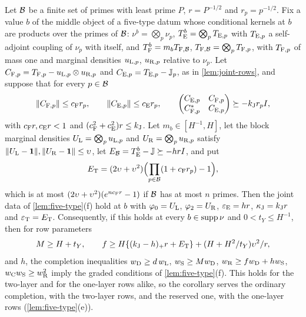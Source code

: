 \begin{corollary}\label{cor:joint-completion-blocks}
Let $\Blk$ be a finite set of primes with least prime $P$, $r=P^{-1/2}$ and
$r_p=p^{-1/2}$. Fix a value $b$ of the middle object of a five-type datum whose
conditional kernels at $b$ are products over the primes of $\Blk$:
$\nu^b=\bigotimes_p\nu_p$, $T^b_{\rm E}=\bigotimes_pT_{{\rm E},p}$ with
$T_{{\rm E},p}$ a self-adjoint coupling of $\nu_p$ with itself, and
$T^b_{\rm F}=m_bT_{{\rm F},\Blk}$, $T_{{\rm F},\Blk}=\bigotimes_pT_{{\rm F},p}$, with
$T_{{\rm F},p}$ of mass one and marginal densities $u_{{\rm L},p}$, $u_{{\rm R},p}$
relative to $\nu_p$. Let $C_{{\rm F},p}=T_{{\rm F},p}-u_{{\rm L},p}\otimes u_{{\rm R},p}$
and $C_{{\rm E},p}=T_{{\rm E},p}-\Jproj_p$, as in \cref{lem:joint-rows}, and suppose
that for every $p\in\Blk$
\[
 \|C_{{\rm F},p}\|\le c_{\rm F}r_p,\qquad \|C_{{\rm E},p}\|\le c_{\rm E}r_p,\qquad
 \begin{pmatrix}C_{{\rm E},p}&C_{{\rm F},p}\\ C_{{\rm F},p}^*&C_{{\rm E},p}\end{pmatrix}
 \succeq-k_{\rm J}r_pI,
\]
with $c_{\rm F}r,c_{\rm E}r<1$ and $(c_{\rm F}^2+c_{\rm E}^2)r\le k_{\rm J}$. Let
$m_b\in[H^{-1},H]$, let the block marginal densities
$U_{\rm L}=\bigotimes_pu_{{\rm L},p}$ and $U_{\rm R}=\bigotimes_pu_{{\rm R},p}$ satisfy
$\|U_{\rm L}-\one\|,\|U_{\rm R}-\one\|\le\upsilon$, let
$E_\Blk=T^b_{\rm E}-\Jproj\succeq-hrI$, and put
\[
 E_{\rm T}=(2\upsilon+\upsilon^2)\Bigl(\prod_{p\in\Blk}(1+c_{\rm F}r_p)-1\Bigr),
\]
which is at most $(2\upsilon+\upsilon^2)(e^{nc_{\rm F}r}-1)$ if $\Blk$ has at most
$n$ primes. Then the joint data of \cref{lem:five-type}(f) hold at $b$ with
$\varphi_0=U_{\rm L}$, $\varphi_2=U_{\rm R}$, $\eps_{\rm E}=hr$,
$\kappa_{\rm J}=k_{\rm J}r$ and $\eps_{\rm T}=E_{\rm T}$. Consequently, if this holds
at every $b\in\supp\nu$ and $0<t_Y\le H^{-1}$, then for row parameters
\[
 M\ge H+t_Y,\qquad
 f\ge\frac{H\{(k_{\rm J}-h)_+r+E_{\rm T}\}+(H+H^2/t_Y)\upsilon^2}{r},
\]
and $h$, the completion inequalities $w_{\rm D}\ge d\,w_{\rm L}$,
$w_{\rm S}\ge Mw_{\rm D}$, $w_{\rm R}\ge fw_{\rm D}+hw_{\rm S}$,
$w_{\rm C}w_{\rm S}\ge w_{\rm R}^2$ imply the graded conditions of
\cref{lem:five-type}(f). This holds for the two-layer and for the one-layer rows
alike, so the corollary serves the ordinary completion, with the two-layer rows,
and the reserved one, with the one-layer rows (\cref{lem:five-type}(e)).
\end{corollary}

